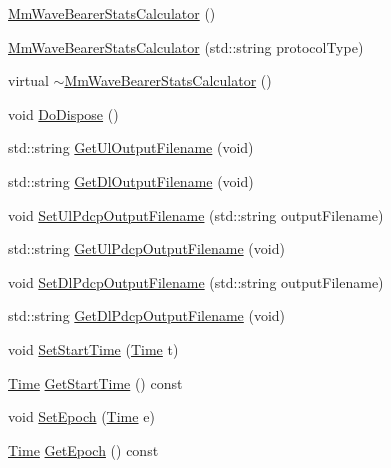 \begin{DoxyCompactItemize}
\item 
\hyperlink{classns3_1_1MmWaveBearerStatsCalculator_ad696a7f74d17f503bc80aff441f46210}{Mm\+Wave\+Bearer\+Stats\+Calculator} ()
\item 
\hyperlink{classns3_1_1MmWaveBearerStatsCalculator_a479b149d1ec8f552d197164a54aff62a}{Mm\+Wave\+Bearer\+Stats\+Calculator} (std\+::string protocol\+Type)
\item 
virtual \hyperlink{classns3_1_1MmWaveBearerStatsCalculator_a041222d5d67aecc5c57a412af3e572ac}{$\sim$\+Mm\+Wave\+Bearer\+Stats\+Calculator} ()
\item 
void \hyperlink{classns3_1_1MmWaveBearerStatsCalculator_a3a26caea8bd4eb00d4ef50ae23a63e2c}{Do\+Dispose} ()
\item 
std\+::string \hyperlink{classns3_1_1MmWaveBearerStatsCalculator_a12a6c9cb22f57948ef0cc2a53d8cac92}{Get\+Ul\+Output\+Filename} (void)
\item 
std\+::string \hyperlink{classns3_1_1MmWaveBearerStatsCalculator_a9649a3b1ab4040cd1492d4e95c0117b4}{Get\+Dl\+Output\+Filename} (void)
\item 
void \hyperlink{classns3_1_1MmWaveBearerStatsCalculator_a774efd40d15c7181fc3d04b659b83d4f}{Set\+Ul\+Pdcp\+Output\+Filename} (std\+::string output\+Filename)
\item 
std\+::string \hyperlink{classns3_1_1MmWaveBearerStatsCalculator_a1ef7bae55aae87a787aa8d0a102553cc}{Get\+Ul\+Pdcp\+Output\+Filename} (void)
\item 
void \hyperlink{classns3_1_1MmWaveBearerStatsCalculator_ac27e7a8ac0a09d3a28785d9c9ed7bc85}{Set\+Dl\+Pdcp\+Output\+Filename} (std\+::string output\+Filename)
\item 
std\+::string \hyperlink{classns3_1_1MmWaveBearerStatsCalculator_aa9803c336c2a4dba1e1b274a9d206647}{Get\+Dl\+Pdcp\+Output\+Filename} (void)
\item 
void \hyperlink{classns3_1_1MmWaveBearerStatsCalculator_adaec4fdc21febe1d4ebfe31580791c89}{Set\+Start\+Time} (\hyperlink{classns3_1_1Time}{Time} t)
\item 
\hyperlink{classns3_1_1Time}{Time} \hyperlink{classns3_1_1MmWaveBearerStatsCalculator_aa37e32dc3164d81cb7b43349c0a7d53b}{Get\+Start\+Time} () const 
\item 
void \hyperlink{classns3_1_1MmWaveBearerStatsCalculator_a47ab01fb08181090c33ee6f628ab3858}{Set\+Epoch} (\hyperlink{classns3_1_1Time}{Time} e)
\item 
\hyperlink{classns3_1_1Time}{Time} \hyperlink{classns3_1_1MmWaveBearerStatsCalculator_a0d17d626f01a537e834abe961bd48b32}{Get\+Epoch} () const 

\end{DoxyCompactItemize}
